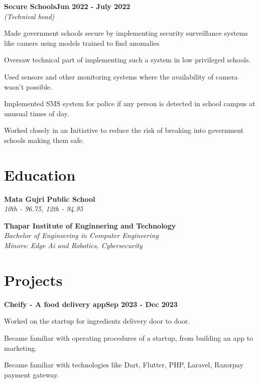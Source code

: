 \documentclass[letterpaper,10pt]{article}
\newcommand{\heading}[2]{
  \hspace{10pt}#1\hfill#2\\
}
\newcommand{\headingBf}[2]{
  \heading{\textbf{#1}}{\textbf{#2}}
}
\newcommand{\headingIt}[2]{
  \heading{\textit{#1}}{\textit{#2}}
}
\newenvironment{resume_list}{
  \vspace{-7pt}
  \begin{itemize}[itemsep=-2px, parsep=1pt, leftmargin=30pt]
}{
  \end{itemize}
}
\begin{document}
  \headingBf{Secure Schools}{Jun 2022 - July 2022}
  \headingIt{(Technical head)}{}
  \begin{resume_list}
    \item Made government schools secure by implementing security surveillance systems like camers using models trained to find anomalies
    \item Oversaw technical part of implementing such a system in low privileged schools. 
    \item Used sensors and other monitoring systems where the availability of camera wasn't possible.
    \item Implemented SMS system for police if any person is detected in school campus at unusual times of day.
    \item Worked closely in an Initiative to reduce the risk of breaking into government schools making them safe.
        
  \end{resume_list}


  \section{Education}
   \headingBf{Mata Gujri Public School}{} %
  \headingIt{10th - 96.75, 12th - 94.95}{}
  \vspace{5pt}

  \headingBf{Thapar Institute of Enginnering and Technology}{} %
  \headingIt{Bachelor of Engineering in Computer Engineering}{}
  \headingIt{Minors: Edge Ai and Robotics, Cybersecurity}{}

 


  \section{Projects}

  \headingBf{Cheify - A food delivery app}{Sep 2023 - Dec 2023}
  \begin{resume_list}
    \item Worked on the startup for ingredients delivery door to door.
    \item Became familiar with operating procedures of a startup, from building an app to marketing.
    \item Became familiar with technologies like Dart, Flutter, PHP, Laravel, Razorpay payment gateway.
  \end{resume_list}
\end{document}
